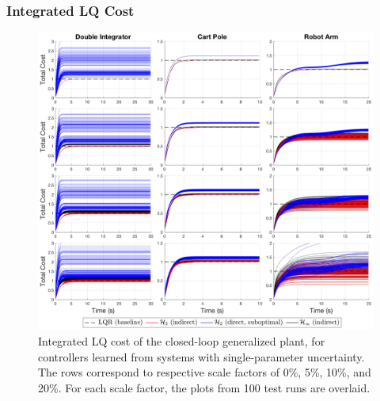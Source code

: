 \subsubsection{Integrated LQ Cost}
\begin{figure}[H]
\centering
	\includegraphics[width=\textwidth]{figures/uncertainty_integrated_cost4_s.png}
\caption{Integrated LQ cost of the closed-loop generalized plant, for controllers learned from systems with single-parameter uncertainty.  The rows correspond to respective scale factors of 0\%, 5\%, 10\%, and 20\%.  For each scale factor, the plots from 100 test runs are overlaid.}
\label{fig:uncertainty_integrated_cost4_s}
\end{figure}

\newpage
